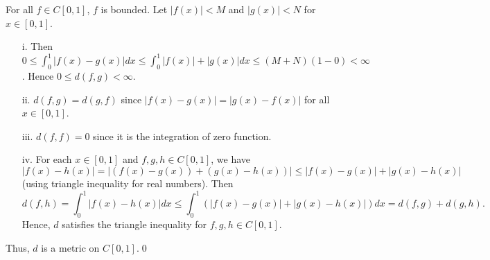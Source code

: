 \begin{solution}
    For all $f\in C[0,1]$, $f$ is bounded. Let $|f(x)|<M$ and
$|g(x)|<N$ for $x\in[0,1]$.
  \begin{enumerate}
    \item[i.]
      Then $0\leq\int_0^1{|f(x)-g(x)| dx}\leq
      \int_0^1{|f(x)|+|g(x)| dx}\leq (M+N)(1-0)<\infty$.
      Hence
      $0\leq d(f,g)<\infty$.
    \item[ii.]
      $d(f,g)=d(g,f)$ since $|f(x)-g(x)|=|g(x)-f(x)|$
      for all $x\in[0,1]$.
    \item[iii.]
      $d(f,f)=0$ since it is the integration of zero function.
    \item[iv.]
      For each $x\in [0,1]$ and $f,g,h\in C[0,1]$, we have
      $|f(x)-h(x)|=|(f(x)-g(x))+(g(x)-h(x))|
      \leq |f(x)-g(x)|+|g(x)-h(x)|$ (using triangle inequality
      for real numbers). Then
      $$d(f,h)=\int_{0}^1{ |f(x) - h(x)| dx}\leq
      \int_{0}^1{\left(|f(x) - g(x)|+|g(x)-h(x)|\right) dx}
      =d(f,g)+d(g,h).$$
      Hence, $d$ satisfies the triangle inequality
      for $f,g,h\in C[0,1]$.
  \end{enumerate}
  Thus, $d$ is a metric on $C[0,1] $.\qed
\end{solution}